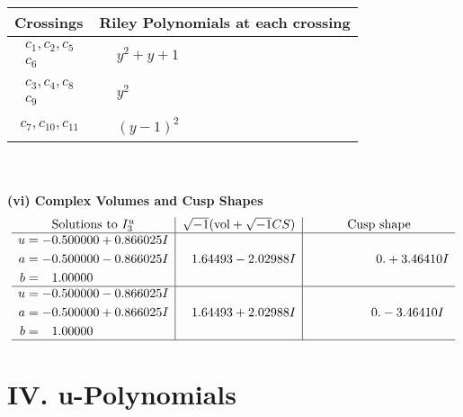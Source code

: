 \documentclass[1p]{elsarticle_modified}
\theoremstyle{definition}
\newcommand{\I}{\sqrt{-1}}
\begin{document}
\begin{tabular}{m{50pt}|m{274pt}}
Crossings & \hspace{64pt}Riley Polynomials at each crossing \\
\hline $$\begin{aligned}c_{1},c_{2},c_{5}\\c_{6}\end{aligned}$$&$\begin{aligned}
&y^2+y+1
\end{aligned}$\\
\hline $$\begin{aligned}c_{3},c_{4},c_{8}\\c_{9}\end{aligned}$$&$\begin{aligned}
&y^2
\end{aligned}$\\
\hline $$\begin{aligned}c_{7},c_{10},c_{11}\end{aligned}$$&$\begin{aligned}
&(y-1)^2
\end{aligned}$\\
\hline
\end{tabular}\\~\\
\newpage\flushleft \textbf{(vi) Complex Volumes and Cusp Shapes}
$$\begin{array}{c|c|c}  
\text{Solutions to }I^u_{3}& \I (\text{vol} + \sqrt{-1}CS) & \text{Cusp shape}\\
 \hline 
\begin{aligned}
u &= -0.500000 + 0.866025 I \\
a &= -0.500000 - 0.866025 I \\
b &= \phantom{-}1.00000\phantom{ +0.000000I}\end{aligned}
 & \phantom{-}1.64493 - 2.02988 I & \phantom{-0.000000 -}0. + 3.46410 I \\ \hline\begin{aligned}
u &= -0.500000 - 0.866025 I \\
a &= -0.500000 + 0.866025 I \\
b &= \phantom{-}1.00000\phantom{ +0.000000I}\end{aligned}
 & \phantom{-}1.64493 + 2.02988 I & \phantom{-0.000000 } 0. - 3.46410 I\\
 \hline 
 \end{array}$$\newpage
\newpage\renewcommand{\arraystretch}{1}
\centering \section*{ IV. u-Polynomials}
\end{document}
